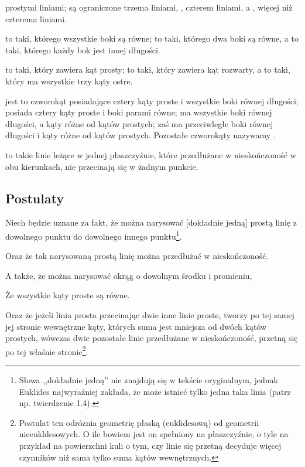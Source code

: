 \documentclass[12pt, a4paper]{scrartcl}
\begin{document}
\begin{definitions}
        prostymi liniami;  są ograniczone trzema liniami,
        , czterem liniami, a , więcej niż
        czterema liniami.
    \item {} to taki, którego wszystkie boki są równe;
         to taki, którego dwa boki są równe,
        a  to taki, którego każdy bok jest innej długości.
    \item {} to taki, który zawiera kąt prosty;
         to taki, który zawiera kąt rozwarty,
        a  to taki, który ma wszystkie trzy kąty ostre.
    \item {} jest to czworokąt posiadające cztery kąty proste
        i wszystkie boki równej długości;  posiada cztery
        kąty proste i boki parami równe;  ma wszystkie boki równej
        długości, a kąty różne od kątów prostych;  zaś
        ma przeciwległe boki równej długości i kąty różne od kątów prostych.
        Pozostałe czworokąty nazywamy .
    \item {} to takie linie leżące w jednej płaszczyźnie,
        które przedłużane w nieskończoność w obu kierunkach, nie przecinają
        się w żadnym punkcie.
\end{definitions}

\subsection*{Postulaty}

\begin{postulates}
    \item Niech będzie uznane za fakt, że można narysować [dokładnie jedną]
        prostą linię z dowolnego punktu do dowolnego innego punktu\footnote{
            Słowa ,,dokładnie jedną'' nie znajdują się w tekście oryginalnym,
            jednak Euklides najwyraźniej zakłada, że może istnieć tylko jedna
            taka linia (patrz np. twierdzenie 1.4).
        }.
    \item Oraz że tak narysowaną prostą linię można przedłużać w nieskończoność.
    \item A także, że można narysować okrąg o dowolnym środku i promieniu,
    \item Że wszystkie kąty proste są równe.
    \item Oraz że jeżeli linia prosta przecinając dwie inne linie proste,
        tworzy po tej samej jej stronie wewnętrzne kąty, których suma jest
        mniejsza od dwóch kątów prostych, wówczas dwie pozostałe linie
        przedłużane w nieskończoność, przetną się po tej właśnie
        stronie\footnote{
            Postulat ten odróżnia geometrię płaską (euklidesową) od geometrii
            nieeukldesowych. O ile bowiem jest on spełniony na płaszczyźnie, o
            tyle na przykład na powierzchni kuli o tym, czy linie się przetną
            decyduje więcej czynników niż sama tylko suma kątów wewnętrznych.
        }.
\end{postulates}
\end{document}
